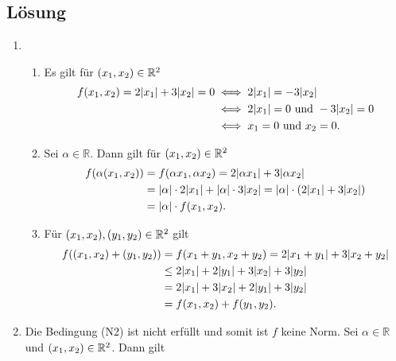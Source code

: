 \documentclass[german,12pt]{homework}
\newcommand{\RR}{\mathbb{R}}
\DeclarePairedDelimiter{\absolute}{\lvert}{\rvert}
\DeclarePairedDelimiter{\enbrace}{(}{)}
\begin{document}
    \subsection*{Lösung}
    \begin{enumerate}
        \item
        \begin{enumerate}[label=(N\arabic*)]
            \item Es gilt für \(\enbrace*{x_1, x_2} \in \RR^2\)
            \begin{align*}
                f\enbrace*{x_1, x_2} = 2\absolute*{x_1} + 3\absolute*{x_2} = 0 &\iff 2\absolute*{x_1} = -3\absolute*{x_2}\\
                &\iff 2\absolute*{x_1} = 0\text{ und }-3\absolute*{x_2} = 0\\
                &\iff x_1 = 0\text{ und }x_2 = 0.
            \end{align*}
            \item Sei \(\alpha \in \RR\). Dann gilt für \(\enbrace*{x_1, x_2} \in \RR^2\)
            \begin{align*}
                f\enbrace*{\alpha\enbrace*{x_1, x_2}} &= f\enbrace*{\alpha{x_1}, \alpha{x_2}} = 2\absolute*{\alpha{x_1}} + 3\absolute*{\alpha{x_2}}\\
                &= \absolute*{\alpha} \cdot 2\absolute*{x_1} + \absolute*{\alpha} \cdot 3\absolute*{x_2} = \absolute*{\alpha} \cdot \enbrace*{2\absolute*{x_1} + 3\absolute*{x_2}}\\
                &= \absolute*{\alpha} \cdot f\enbrace*{x_1, x_2}.
            \end{align*}
            \item Für \(\enbrace*{x_1, x_2}, \enbrace*{y_1, y_2} \in \RR^2\) gilt
            \begin{align*}
                f\enbrace*{\enbrace*{x_1, x_2} + \enbrace*{y_1, y_2}} &= f\enbrace*{x_1 + y_1, x_2 + y_2} = 2\absolute*{x_1 + y_1} + 3\absolute*{x_2 + y_2}\\
                &\le 2\absolute*{x_1} + 2\absolute*{y_1} + 3\absolute*{x_2} + 3\absolute*{y_2}\\
                &= 2\absolute*{x_1} + 3\absolute*{x_2} + 2\absolute*{y_1} + 3\absolute*{y_2}\\
                &= f\enbrace*{x_1, x_2} + f\enbrace*{y_1, y_2}.
            \end{align*}
        \end{enumerate}
        \item Die Bedingung (N2) ist nicht erfüllt und somit ist \(f\) keine Norm. Sei \(\alpha \in \RR\) und \(\enbrace*{x_1, x_2} \in \RR^2\). Dann gilt

\end{enumerate}
\end{document}
